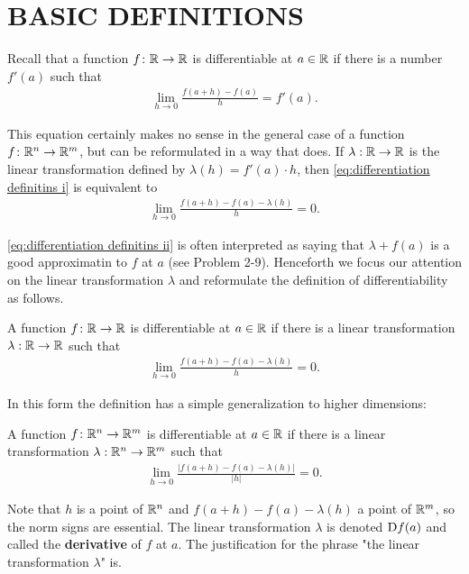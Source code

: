 \section[\textsc{basic definitins}]{BASIC DEFINITIONS}
Recall that a function $f\colon{}\mathbb{R} \to \mathbb{R}$ is differentiable at $a\in \mathbb{R}$
if there is a number $f'(a)$ such that 
\begin{align}
    \lim_{h\to 0 }{\frac{f(a+h)-f(a)}{h}} = f'(a).
    \label{eq:differentiation definitins i}
\end{align} 

This equation certainly makes no sense in the general case of a
function $f\colon{}\mathbb{R}^n \to \mathbb{R}^m$, but can be reformulated in a way that
does. If $\lambda: \mathbb{R} \to \mathbb{R}$ is the linear transformation defined by
$\lambda(h) = f'(a)\cdot h$, then \eqref{eq:differentiation definitins i} 
is equivalent to 
\begin{align}
    \lim_{h\to 0 }{\frac{f(a+h)-f(a)-\lambda(h)}{h}} = 0.
    \label{eq:differentiation definitins ii}
\end{align} 

\eqref{eq:differentiation definitins ii} is often interpreted as saying that 
$\lambda + f(a)$ is a good approximatin to $f$ at $a$ (see Problem 2-9).
Henceforth we focus our attention on the linear transformation $\lambda$ and
reformulate the definition of differentiability as follows.

A function $f\colon{}\mathbb{R} \to \mathbb{R}$ is differentiable at $a\in \mathbb{R}$
if there is a linear transformation $\lambda:\mathbb{R}\to \mathbb{R}$ such that 
\begin{align}
    \lim_{h\to 0 }{\frac{f(a+h)-f(a)-\lambda(h)}{h}} = 0.
    \label{eq:differentiation definitins iii}
\end{align} 

In this form the definition has a simple generalization to
higher dimensions:

A function $f\colon{}\mathbb{R}^n \to \mathbb{R}^m$ is differentiable at $a\in \mathbb{R}$
if there is a linear transformation $\lambda:\mathbb{R}^n\to \mathbb{R}^m$ such that
\begin{align}
    \lim_{h\to 0 }{\frac{|f(a+h)-f(a)-\lambda(h)|}{|h|}} = 0.
    \label{eq:differentiation definitins iiii}
\end{align} 

Note that $h$ is a point of $\mathbb{R}^n$ and $f(a+h)-f(a)-\lambda(h)$ a
point of $\mathbb{R}^m$, so the norm signs are essential. The linear 
transformation $\lambda$ is denoted $\mathrm{D}f(a)$ and called the \textbf{derivative} of 
$f$ at $a$. The justification for the phrase "the linear transformation $\lambda$" is.

